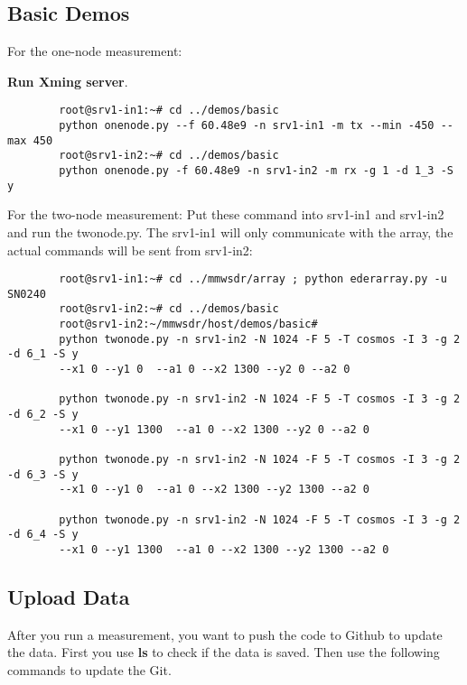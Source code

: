 \documentclass{article}
\begin{document}
        
    \subsection{Basic Demos}    
        For the one-node measurement:
        
        \textbf{Run Xming server}. 
    
        \begin{verbatim}
        root@srv1-in1:~# cd ../demos/basic
        python onenode.py --f 60.48e9 -n srv1-in1 -m tx --min -450 --max 450
        root@srv1-in2:~# cd ../demos/basic
        python onenode.py -f 60.48e9 -n srv1-in2 -m rx -g 1 -d 1_3 -S y 
        \end{verbatim}
        
        For the two-node measurement:
        Put these command into srv1-in1 and srv1-in2 and run the twonode.py. The srv1-in1 will only communicate with the array, the actual commands will be sent from srv1-in2: 
        
        
        \begin{verbatim}
        root@srv1-in1:~# cd ../mmwsdr/array ; python ederarray.py -u SN0240
        root@srv1-in2:~# cd ../demos/basic
        root@srv1-in2:~/mmwsdr/host/demos/basic#
        python twonode.py -n srv1-in2 -N 1024 -F 5 -T cosmos -I 3 -g 2 -d 6_1 -S y
        --x1 0 --y1 0  --a1 0 --x2 1300 --y2 0 --a2 0
        
        python twonode.py -n srv1-in2 -N 1024 -F 5 -T cosmos -I 3 -g 2 -d 6_2 -S y
        --x1 0 --y1 1300  --a1 0 --x2 1300 --y2 0 --a2 0
        
        python twonode.py -n srv1-in2 -N 1024 -F 5 -T cosmos -I 3 -g 2 -d 6_3 -S y
        --x1 0 --y1 0  --a1 0 --x2 1300 --y2 1300 --a2 0
        
        python twonode.py -n srv1-in2 -N 1024 -F 5 -T cosmos -I 3 -g 2 -d 6_4 -S y
        --x1 0 --y1 1300  --a1 0 --x2 1300 --y2 1300 --a2 0
        \end{verbatim}
        
    \subsection{Upload Data}
        After you run a measurement, you want to push the code to Github to update the data. First you use \textbf{ls} to check if the data is saved. Then use the following commands to update the Git. 
\end{document}

